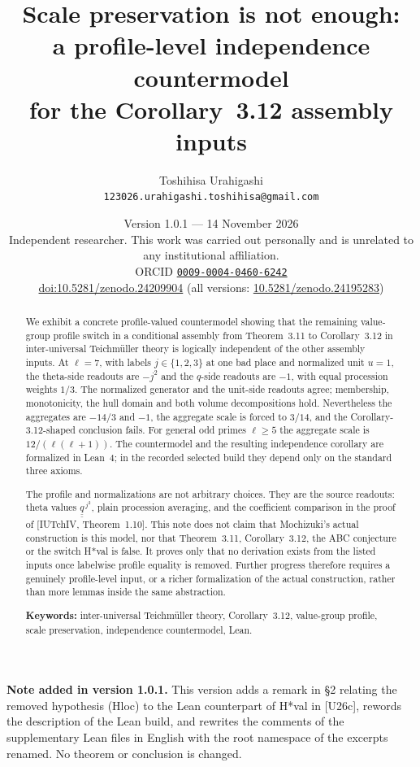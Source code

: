 \documentclass[11pt]{article}
\title{Scale preservation is not enough:\\
a profile-level independence countermodel\\
for the Corollary~3.12 assembly inputs}
\author{Toshihisa Urahigashi\\
\small\texttt{123026.urahigashi.toshihisa@gmail.com}}
\date{Version 1.0.1 --- 14 November 2026\\[3pt]
\small Independent researcher. This work was carried out personally and is
unrelated to any institutional affiliation.\\[3pt]
\small ORCID \href{https://orcid.org/0009-0004-0460-6242}{\texttt{0009-0004-0460-6242}}\\[-2pt]
\small \href{https://doi.org/10.5281/zenodo.24209904}{doi:10.5281/zenodo.24209904} (all versions: \href{https://doi.org/10.5281/zenodo.24195283}{10.5281/zenodo.24195283})}
\newcommand{\uu}[1]{\underline{\underline{#1}}}
\theoremstyle{definition}
\begin{document}
\maketitle

\begin{abstract}
We exhibit a concrete profile-valued countermodel showing that the
remaining value-group profile switch in a conditional assembly from
Theorem~3.11 to Corollary~3.12 in inter-universal Teichm\"uller theory
is logically independent of the other assembly inputs.  At
$\ell=7$, with labels $j\in\{1,2,3\}$ at one bad place and
normalized unit $u=1$, the theta-side readouts are $-j^2$ and the
$q$-side readouts are $-1$, with equal procession weights $1/3$.
The normalized generator and the unit-side readouts agree;
membership, monotonicity, the hull domain and both volume
decompositions hold.  Nevertheless the aggregates are $-14/3$ and
$-1$, the aggregate scale is forced to $3/14$, and the
Corollary-3.12-shaped conclusion fails.  For general odd primes
$\ell\ge5$ the aggregate scale is $12/(\ell(\ell+1))$.  The
countermodel and the resulting independence corollary are
formalized in Lean~4; in the recorded selected build they depend
only on the standard three axioms.

The profile and normalizations are not arbitrary choices.  They are
the source readouts: theta values $\uu q^{\,j^2}$, plain procession
averaging, and the coefficient comparison in the proof of
[IUTchIV, Theorem~1.10].  This note does not claim that
Mochizuki's actual construction is this model, nor that
Theorem~3.11, Corollary~3.12, the ABC conjecture or the switch
H*val is false.  It proves only that no derivation exists from the
listed inputs once labelwise profile equality is removed.  Further
progress therefore requires a genuinely profile-level input, or a
richer formalization of the actual construction, rather than more
lemmas inside the same abstraction.

\medskip
\noindent\textbf{Keywords:} inter-universal Teichm\"uller theory,
Corollary~3.12, value-group profile, scale preservation,
independence countermodel, Lean.
\end{abstract}

\medskip
\noindent\textbf{Note added in version 1.0.1.}
This version adds a remark in \S2 relating the removed hypothesis
(Hloc) to the Lean counterpart of H*val in [U26c], rewords the
description of the Lean build, and rewrites the comments of the
supplementary Lean files in English with the root namespace of the
excerpts renamed.  No theorem or conclusion is changed.
\end{document}
